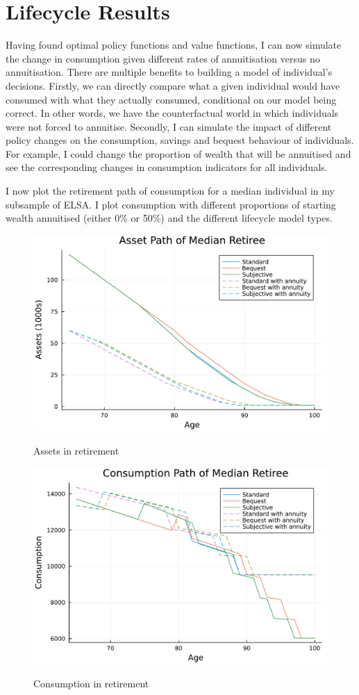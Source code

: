 \documentclass[12pt]{article}
\begin{document}
\section{Lifecycle Results}

Having found optimal policy functions and value functions, I can now simulate the
change in consumption given different rates of annuitisation versus no
annuitisation. There are multiple benefits to building a model of individual's
decisions. Firstly, we can directly compare what a given individual would have
consumed with what they actually consumed, conditional on our model being
correct. In other words, we have the counterfactual world in which individuals
were not forced to annuitise. Secondly, I can simulate the impact of different
policy changes on the consumption, savings and bequest behaviour of individuals.
For example, I could change the proportion of wealth that will be annuitised and
see the corresponding changes in consumption indicators for all individuals.

I now plot the retirement path of consumption for a median individual in my
subsample of ELSA. I plot consumption with different proportions of starting wealth
annuitised (either 0\% or 50\%) and the different lifecycle model types.

\begin{figure}[h]
    \caption{Assets in retirement}
    \centering
    \includegraphics[width=0.7\columnwidth]{figures/asset_plot_median_retiree.pdf}
    \label{fig:AssetPlot}
\end{figure}
\begin{figure}[h]
    \caption{Consumption in retirement}
    \centering
    \includegraphics[width=0.7\columnwidth]{figures/consumption_plot_median_retiree.pdf}
    \label{fig:ConsumpPlot}
\end{figure}
\end{document}
